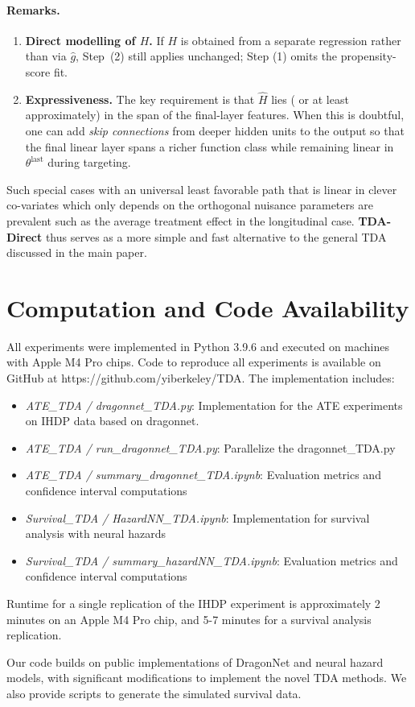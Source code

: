 \documentclass{article}
\theoremstyle{remark}
\begin{document}
\paragraph{Remarks.}
\begin{enumerate}[leftmargin=1.4em,label=(\roman*)]
  \item \textbf{Direct modelling of $H$.}  
        If $H$ is obtained from a separate regression rather than via
        $\hat{g}$, Step~(2) still applies unchanged; Step (1) omits the
        propensity-score fit.
  \item \textbf{Expressiveness.}  
        The key requirement is that $\hat{H}$ lies ( or at least approximately) in the span
        of the final-layer features.  When this is doubtful, one can add
        \emph{skip connections} from deeper hidden units to the output so that
        the final linear layer spans a richer function class while remaining
        linear in~$\theta^{\mathrm{last}}$ during targeting.
\end{enumerate}

Such special cases with an universal least favorable path that is linear in clever co-variates which only depends on the orthogonal nuisance parameters are prevalent such as the average treatment effect in the longitudinal case. \textbf{TDA-Direct} thus serves as a more simple and fast alternative to the general TDA discussed in the main paper.



\section{Computation and Code Availability}
\label{app}
All experiments were implemented in Python 3.9.6 and executed on machines with Apple M4 Pro chips. Code to reproduce all experiments is available on GitHub at https://github.com/yiberkeley/TDA. The implementation includes:
\begin{itemize}[leftmargin=15pt]
\item \emph{ATE\_TDA / dragonnet\_TDA.py}: Implementation for the ATE experiments on IHDP data based on dragonnet.
\item \emph{ATE\_TDA / run\_dragonnet\_TDA.py}: Parallelize the dragonnet\_TDA.py
\item \emph{ATE\_TDA / summary\_dragonnet\_TDA.ipynb}: Evaluation metrics and confidence interval computations
\item
\emph{Survival\_TDA / HazardNN\_TDA.ipynb}: Implementation for survival analysis with neural hazards
\item \emph{Survival\_TDA / summary\_hazardNN\_TDA.ipynb}: Evaluation metrics and confidence interval computations
\end{itemize}
Runtime for a single replication of the IHDP experiment is approximately 2 minutes on an Apple M4 Pro chip, and 5-7 minutes for a survival analysis replication.

Our code builds on public implementations of DragonNet and neural hazard models, with significant modifications to implement the novel TDA methods. We also provide scripts to generate the simulated survival data.
\end{document}
